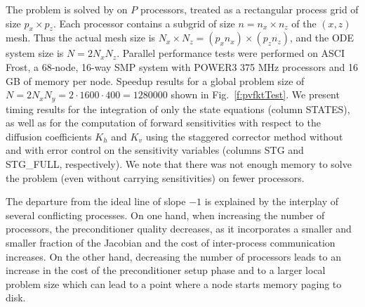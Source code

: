 The problem is solved by {\cvodes} on $P$ processors, treated as a 
rectangular process grid of size $p_x \times p_z$.
Each processor contains a subgrid of size $n = n_x \times n_z$ of the 
$(x,z)$ mesh.  Thus the actual mesh size is 
$N_x \times N_z = (p_x n_x) \times (p_z n_z)$,
and the ODE system size is $N = 2 N_x N_z$.
Parallel performance tests were performed on ASCI Frost, a 68-node, 16-way SMP system
with POWER3 375 MHz processors and 16 GB of memory per node.
Speedup results for a global problem size of
$N = 2 N_x N_y = 2 \cdot 1600 \cdot 400 = 1280000$ 
shown in Fig.~\ref{f:pvfktTest}.
We present timing results for the integration of only the state equations
(column STATES), as well as for
the computation of forward sensitivities with respect to the diffusion coefficients
$K_h$ and $K_v$ using the staggered corrector method without and with 
error control on the sensitivity variables (columns STG and
STG\_FULL, respectively). 
We note that there was not enough memory to solve the problem (even without
carrying sensitivities) on fewer processors.

The departure from the ideal line of slope $-1$ is explained by the 
interplay of several conflicting processes. On one hand, when increasing the 
number of processors, the preconditioner quality decreases, as it incorporates 
a smaller and smaller fraction of the Jacobian and the cost of inter-process 
communication increases. On the other hand, decreasing the number of processors
leads to an increase in the cost of the preconditioner setup phase and to a larger
local problem size which can lead to a point where a node starts memory paging to disk.

